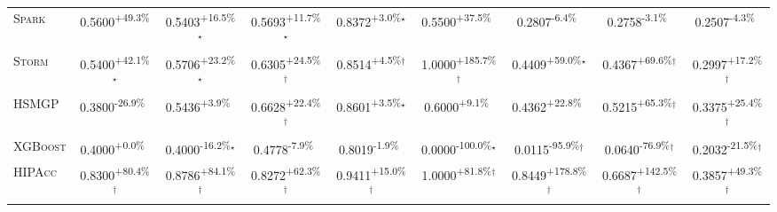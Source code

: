\begin{table}[htbp]
\begin{tabular}{l|cccc|cccc}
\textsc{Spark} & \cellcolor{green!30}0.5600\textsuperscript{+49.3\%}$^{\,\,\,}$ & \cellcolor{green!30}0.5403\textsuperscript{+16.5\%}$^\star$ & \cellcolor{green!30}0.5693\textsuperscript{+11.7\%}$^\star$ & \cellcolor{green!30}0.8372\textsuperscript{+3.0\%}$^\star$ & \cellcolor{green!30}0.5500\textsuperscript{+37.5\%}$^{\,\,\,}$ & \cellcolor{red!30}0.2807\textsuperscript{-6.4\%}$^{\,\,\,}$ & \cellcolor{red!30}0.2758\textsuperscript{-3.1\%}$^{\,\,\,}$ & \cellcolor{red!30}0.2507\textsuperscript{-4.3\%}$^{\,\,\,}$ \\
\textsc{Storm} & \cellcolor{green!30}0.5400\textsuperscript{+42.1\%}$^\star$ & \cellcolor{green!30}0.5706\textsuperscript{+23.2\%}$^\star$ & \cellcolor{green!30}0.6305\textsuperscript{+24.5\%}$^\dagger$ & \cellcolor{green!30}0.8514\textsuperscript{+4.5\%}$^\dagger$ & \cellcolor{green!30}1.0000\textsuperscript{+185.7\%}$^\dagger$ & \cellcolor{green!30}0.4409\textsuperscript{+59.0\%}$^\star$ & \cellcolor{green!30}0.4367\textsuperscript{+69.6\%}$^\dagger$ & \cellcolor{green!30}0.2997\textsuperscript{+17.2\%}$^\dagger$ \\
\textsc{HSMGP} & \cellcolor{red!30}0.3800\textsuperscript{-26.9\%}$^{\,\,\,}$ & \cellcolor{green!30}0.5436\textsuperscript{+3.9\%}$^{\,\,\,}$ & \cellcolor{green!30}0.6628\textsuperscript{+22.4\%}$^\dagger$ & \cellcolor{green!30}0.8601\textsuperscript{+3.5\%}$^\star$ & \cellcolor{green!30}0.6000\textsuperscript{+9.1\%}$^{\,\,\,}$ & \cellcolor{green!30}0.4362\textsuperscript{+22.8\%}$^{\,\,\,}$ & \cellcolor{green!30}0.5215\textsuperscript{+65.3\%}$^\dagger$ & \cellcolor{green!30}0.3375\textsuperscript{+25.4\%}$^\dagger$ \\
\textsc{XGBoost} & \cellcolor{green!30}0.4000\textsuperscript{+0.0\%}$^{\,\,\,}$ & \cellcolor{red!30}0.4000\textsuperscript{-16.2\%}$^\star$ & \cellcolor{red!30}0.4778\textsuperscript{-7.9\%}$^{\,\,\,}$ & \cellcolor{red!30}0.8019\textsuperscript{-1.9\%}$^{\,\,\,}$ & \cellcolor{red!30}0.0000\textsuperscript{-100.0\%}$^\star$ & \cellcolor{red!30}0.0115\textsuperscript{-95.9\%}$^\dagger$ & \cellcolor{red!30}0.0640\textsuperscript{-76.9\%}$^\dagger$ & \cellcolor{red!30}0.2032\textsuperscript{-21.5\%}$^\dagger$ \\
\textsc{HIPAcc} & \cellcolor{green!30}0.8300\textsuperscript{+80.4\%}$^\dagger$ & \cellcolor{green!30}0.8786\textsuperscript{+84.1\%}$^\dagger$ & \cellcolor{green!30}0.8272\textsuperscript{+62.3\%}$^\dagger$ & \cellcolor{green!30}0.9411\textsuperscript{+15.0\%}$^\dagger$ & \cellcolor{green!30}1.0000\textsuperscript{+81.8\%}$^\dagger$ & \cellcolor{green!30}0.8449\textsuperscript{+178.8\%}$^\dagger$ & \cellcolor{green!30}0.6687\textsuperscript{+142.5\%}$^\dagger$ & \cellcolor{green!30}0.3857\textsuperscript{+49.3\%}$^\dagger$ \\

\end{tabular}
\end{table}
